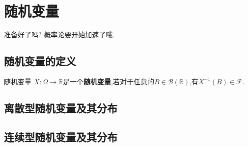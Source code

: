\chapter{随机变量}
准备好了吗? 概率论要开始加速了哦.
\section{随机变量的定义}
\begin{definition}{随机变量}
    $X:\Omega\to\mathbb{R}$是一个\textbf{随机变量},若对于任意的$B\in\mathcal{B}(\mathbb{R})$,有$X^{-1}(B)\in\mathcal{F}$.
\end{definition}
\section{离散型随机变量及其分布}
\section{连续型随机变量及其分布}
